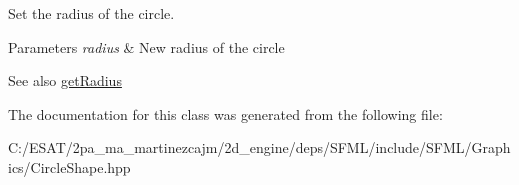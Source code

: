 Set the radius of the circle. 


\begin{DoxyParams}{Parameters}
{\em radius} & New radius of the circle\\
\hline
\end{DoxyParams}
\begin{DoxySeeAlso}{See also}
\hyperlink{classsf_1_1_circle_shape_aa3dd5a1b5031486ce5b6f09d43674aa3}{get\+Radius} 
\end{DoxySeeAlso}


The documentation for this class was generated from the following file\+:\begin{DoxyCompactItemize}
\item 
C\+:/\+E\+S\+A\+T/2pa\+\_\+ma\+\_\+martinezcajm/2d\+\_\+engine/deps/\+S\+F\+M\+L/include/\+S\+F\+M\+L/\+Graphics/Circle\+Shape.\+hpp\end{DoxyCompactItemize}

